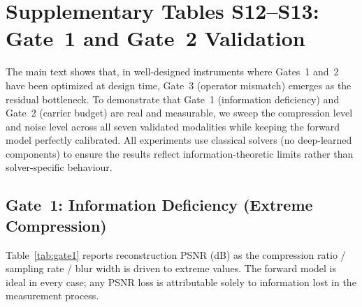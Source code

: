 \documentclass[11pt]{article}
\theoremstyle{definition}
\begin{document}
\newpage
\section{Supplementary Tables S12--S13: Gate~1 and Gate~2 Validation}
\label{sec:gate12}

The main text shows that, in well-designed instruments where Gates~1 and~2
have been optimized at design time, Gate~3 (operator mismatch) emerges as the
residual bottleneck. To demonstrate that
Gate~1 (information deficiency) and Gate~2 (carrier budget) are real and
measurable, we sweep the compression level and noise level across all
seven validated modalities while keeping the forward model perfectly
calibrated.  All experiments use classical solvers (no deep-learned
components) to ensure the results reflect information-theoretic limits
rather than solver-specific behaviour.

\subsection{Gate~1: Information Deficiency (Extreme Compression)}

Table~\ref{tab:gate1} reports reconstruction PSNR (dB) as the
compression ratio / sampling rate / blur width is driven to extreme
values.  The forward model is ideal in every case; any PSNR loss is
attributable solely to information lost in the measurement process.
\end{document}

